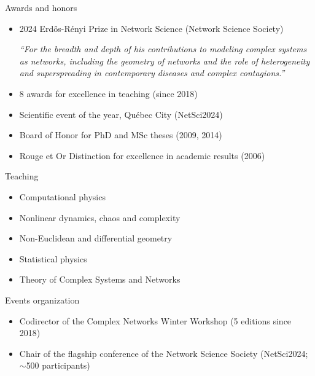 \documentclass[10pt]{article}
\begin{document}
\vspace*{\baselineskip}
\begin{minipage}[t]{0.56\textwidth}
  {\large\color{monbleu}Awards and honors}
  \begin{itemize}
    \item 2024 Erd\H{o}s-Rényi Prize in Network Science (Network Science Society)
    \begin{center}
      \begin{minipage}{0.8\textwidth}
        \small\textit{``For the breadth and depth of his contributions to modeling complex systems as networks, including the geometry of networks and the role of heterogeneity and superspreading in contemporary diseases and complex contagions.''}
      \end{minipage}
    \end{center}
    \item 8 awards for excellence in teaching (since 2018)
    \item Scientific event of the year, Québec City (NetSci2024)
    \item Board of Honor for PhD and MSc theses (2009, 2014)
    \item Rouge et Or Distinction for excellence in academic results (2006)
  \end{itemize}
\end{minipage}
\hfill
\begin{minipage}[t]{0.42\textwidth}
  {\large\color{monbleu}Teaching}
  \begin{itemize}
    \item Computational physics
    \item Nonlinear dynamics, chaos and complexity
    \item Non-Euclidean and differential geometry
    \item Statistical physics
    \item Theory of Complex Systems and Networks 
  \end{itemize}
  {\large\color{monbleu}Events organization}
  \begin{itemize}
    \item Codirector of the Complex Networks Winter Workshop (5 editions since 2018)
    \item Chair of the flagship conference of the Network Science Society (NetSci2024; $\sim$500 participants)
  \end{itemize}
\end{minipage}
\end{document}
